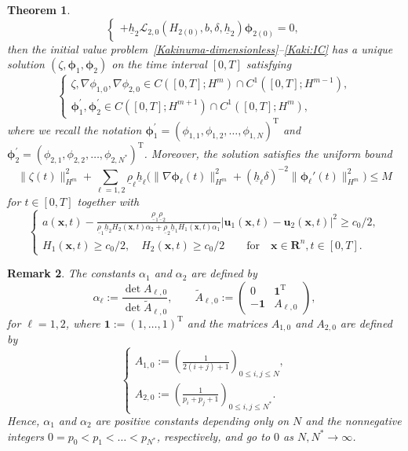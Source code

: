 \documentclass[11pt,leqno]{article}
\newtheorem{theorem}{\bf Theorem}[section]
\newtheorem{remark}[theorem]{\bf Remark}
\numberwithin{equation}{section}
\numberwithin{figure}{section}
\begin{document}
\begin{theorem}
\begin{equation}
\begin{cases}
  +  \underline{h}_2\mathcal{L}_{2,0}(H_{2(0)},b,\delta,\underline{h}_2)  {\bm \phi}_{2(0)} = 0,
\end{cases}
\end{equation}
%
then the initial value problem~\eqref{Kakinuma-dimensionless}--\eqref{Kaki:IC} has a unique solution 
$(\zeta,\bm{\phi}_1,\bm{\phi}_2)$ on the time interval $[0,T]$ satisfying 
%
\[
\begin{cases}
\zeta,\nabla\phi_{1,0},\nabla\phi_{2,0} \in C([0,T];H^m)\cap  C^1([0,T];H^{m-1}), \\
{\bm \phi}_1^{\prime},{\bm \phi}_2^{\prime} \in C([0,T];H^{m+1})\cap  C^1([0,T];H^{m}),
\end{cases}
\]
%
where we recall the notation 
${\bm \phi}_1^{\prime} = (\phi_{1,1},\phi_{1,2},\ldots,\phi_{1,N})^\mathrm{T}$ and 
${\bm \phi}_2^{\prime} = (\phi_{2,1},\phi_{2,2},\ldots,\phi_{2,N^*})^\mathrm{T}$. 
Moreover, the solution satisfies the uniform bound 
%
\begin{equation}\label{uniform-sol}
\|\zeta(t)\|_{H^m}^2 + \sum_{\ell=1,2}\underline{\rho}_\ell\underline{h}_\ell\bigl(
 \|\nabla\bm{\phi}_\ell(t)\|_{H^m}^2 + (\underline{h}_\ell\delta)^{-2}\|\bm{\phi}_\ell'(t)\|_{H^m}^2\bigr) \leq M
\end{equation}
%
for $t\in[0,T]$ together with 
%
\begin{equation}\label{uniform-below}
\begin{cases}
\displaystyle
 a(\bm{x},t)- \frac{\underline{\rho}_1\underline{\rho}_2}{
  \underline{\rho}_1\underline{h}_2H_2(\bm{x},t)\alpha_2 + \underline{\rho}_2\underline{h}_1H_1(\bm{x},t)\alpha_1}
  |{\bm u}_1(\bm{x},t)-{\bm u}_2(\bm{x},t)|^2 \geq c_0/2, \\
\displaystyle
 H_1(\bm{x},t) \geq c_0/2, \quad H_2(\bm{x},t) \geq c_0/2
 \qquad \mbox{for}\quad \bm{x}\in\mathbf{R}^n, t\in[0,T].
\end{cases}
\end{equation}
\end{theorem}
%
\begin{remark}\label{remark-alpha}
The constants $\alpha_1$ and $\alpha_2$ are defined by
\begin{equation}\label{def-alpha-intro}
	\alpha_\ell := \frac{\det A_{\ell,0}}{\det \tilde{A}_{\ell,0}}, \qquad
	\tilde{A}_{\ell,0} := 
	\begin{pmatrix}
		0 & \bm{1}^\mathrm{T} \\
		-\bm{1} & A_{\ell,0}
	\end{pmatrix},
\end{equation}
%
for $\ell=1,2$, where $\bm{1}:=(1,\ldots,1)^\mathrm{T}$ and the matrices $A_{1,0}$ and $A_{2,0}$ are defined by
\[
	\begin{cases}
		\displaystyle
		A_{1,0} := \left( \frac{1}{2(i+j)+1} \right)_{0\leq i,j\leq N}, \\
		\displaystyle
		A_{2,0} := \left( \frac{1}{p_i+p_j+1}\right)_{0\leq i,j\leq N^*}.
	\end{cases}
\]
%
Hence, $\alpha_1$ and $\alpha_2$ are positive constants depending only on $N$ and the nonnegative integers $0=p_0<p_1<\ldots<p_{N^*}$, respectively, 
and go to $0$ as $N,N^*\to\infty$. 
\end{remark}
\end{document}
